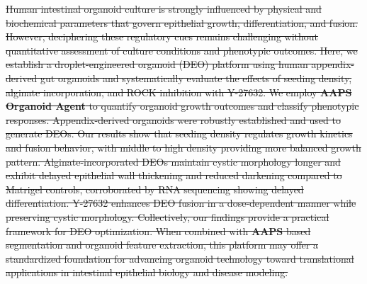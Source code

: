 \documentclass[
]{article}
\providecommand{\DIFdel}[1]{{\begingroup\color{red}\sout{#1}\endgroup}}
\begin{document}
\DIFdel{Human intestinal organoid culture is strongly influenced by physical and biochemical parameters that govern epithelial growth, differentiation, and fusion. However, deciphering these regulatory cues remains challenging without quantitative assessment of culture conditions and phenotypic outcomes. Here, we establish a droplet-engineered organoid (DEO) platform using human appendix-derived gut organoids and systematically evaluate the effects of seeding density, alginate incorporation, and ROCK inhibition with Y-27632. We employ \textbf{AAPS Organoid Agent} to quantify organoid growth outcomes and classify phenotypic responses. Appendix-derived organoids were robustly established and used to generate DEOs. Our results show that seeding density regulates growth kinetics and fusion behavior, with middle to high density providing more balanced growth pattern. Alginate-incorporated DEOs maintain cystic morphology longer and exhibit delayed epithelial wall thickening and reduced darkening compared to Matrigel controls, corroborated by RNA sequencing showing delayed differentiation. Y-27632 enhances DEO fusion in a dose-dependent manner while preserving cystic morphology. Collectively, our findings provide a practical framework for DEO optimization. When combined with \textbf{AAPS} based segmentation and organoid feature extraction, this platform may offer a standardized foundation for advancing organoid technology toward translational applications in intestinal epithelial biology and disease modeling.}
\end{document}
